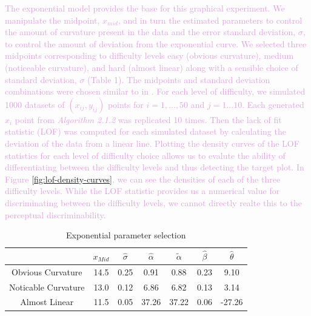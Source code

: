 \documentclass[]{interact}
\theoremstyle{plain}%
\theoremstyle{definition}
\theoremstyle{remark}
\begin{document}
\textcolor{Plum}{
The exponential model provides the base for this graphical experiment. 
We manipulate the midpoint, $x_{mid}$, and in turn the estimated parameters to control the amount of curvature present in the data and the error standard deviation, $\sigma$, to control the amount of deviation from the exponential curve.
We selected three midpoints corresponding to difficulty levels easy (obvious curvature), medium (noticeable curvature), and hard (almost linear) along with a sensible choice of standard deviation, $\sigma$ (Table 1).
The midpoints and standard deviation combinations were chosen similar to in \cite{vanderplas_clusters_2017}. 
For each level of difficulty, we simulated 1000 datasets of $(x_{ij}, y_{ij})$ points for $i = 1,...,50$ and $j = 1...10$. 
Each generated $x_i$ point from \textit{Algorithm 2.1.2} was replicated 10 times.  
Then the lack of fit statistic (LOF) was computed for each simulated dataset by calculating the deviation of the data from a linear line. 
Plotting the density curves of the LOF statistics for each level of difficulty choice allows us to evalute the ability of differentiating between the difficulty levels and thus detecting the target plot.
In Figure \ref{fig:lof-density-curves}, we can see the densities of each of the three difficulty levels. 
While the LOF statistic provides us a numerical value for discriminating between the difficulty levels, we cannot directly realte this to the perceptual discriminability. 
}

\begin{table}

\caption{\label{tab:parameter-data}Exponential parameter selection}
\centering
\begin{tabular}[t]{ccccccc}
\toprule
 & $x_{Mid}$ & $\hat\sigma$ & $\hat\alpha$ & $\tilde\alpha$ & $\hat\beta$ & $\hat\theta$\\
\midrule
Obvious Curvature & 14.5 & 0.25 & 0.91 & 0.88 & 0.23 & 9.10\\
Noticable Curvature & 13.0 & 0.12 & 6.86 & 6.82 & 0.13 & 3.14\\
Almost Linear & 11.5 & 0.05 & 37.26 & 37.22 & 0.06 & -27.26\\
\bottomrule
\end{tabular}
\end{table}
\end{document}
